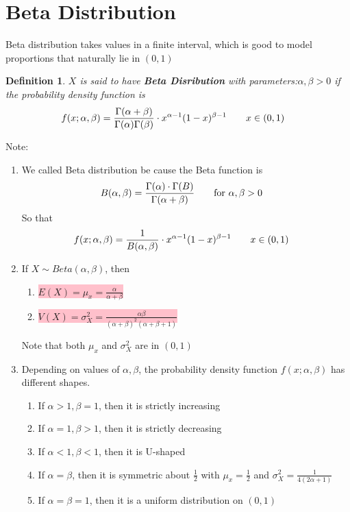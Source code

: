 \documentclass[11pt,oneside]{book}
\theoremstyle{newStyle}
\newtheorem{defn}[thm]{Definition}
\newcommand{\note}{\color{red}Note: \color{black}}
\begin{document}
\section[Beta Distribution]{Beta Distribution}
Beta distribution takes values in a finite interval, which is good to model proportions that naturally lie in $(0,1)$\begin{defn}
$X$ is said to have \textbf{Beta Disribution} with parameters:$\alpha,\beta>0$ if the probability density function is \begin{align*}
f(x;\alpha,\beta)&=\frac{\Gamma(\alpha+\beta)}{\Gamma(\alpha)\Gamma(\beta)}\cdot x^{\alpha -1}(1-x)^{\beta -1} \text{\qquad}x\in (0,1)
\end{align*}
\end{defn}
\note \begin{enumerate}
\item We called Beta distribution be cause the Beta function is \begin{align*}
B(\alpha,\beta)&=\frac{\Gamma(\alpha)\cdot \Gamma(B)}{\Gamma(\alpha+\beta)} \text{\qquad for }\alpha,\beta>0
\end{align*}
So that \begin{align*}
f(x;\alpha,\beta)&=\frac{1}{B(\alpha,\beta)}\cdot x^{\alpha -1}(1-x)^{\beta -1} \text{\qquad}x\in (0,1)
\end{align*}
\item If $X\sim Beta(\alpha,\beta)$, then \begin{enumerate}
\item \colorbox{pink}{$E(X)=\mu_x=\frac{\alpha}{\alpha+\beta}$}
\item \colorbox{pink}{$V(X)=\sigma_X^2=\frac{\alpha \beta}{(\alpha+\beta)^2(\alpha+\beta+1)}$}
\end{enumerate}
Note that both $\mu_x$ and $\sigma_X^2$ are in $(0,1)$
\item Depending on values of $\alpha,\beta$, the probability density function $f(x;\alpha,\beta)$ has different shapes.  \begin{enumerate}
\item If $\alpha>1,\beta =1$, then it is strictly increasing
\item If $\alpha=1,\beta >1$, then it is strictly decreasing
\item If $\alpha<1,\beta <1$, then it is U-shaped
\item If $\alpha=\beta$, then it is symmetric about $\frac{1}{2}$ with $\mu_x=\frac{1}{2}$ and $\sigma_X^2=\frac{1}{4(2\alpha+1)}$
\item If $\alpha=\beta=1$, then it is a uniform distribution on $(0,1)$
\end{enumerate}
\end{enumerate}
\end{document}
